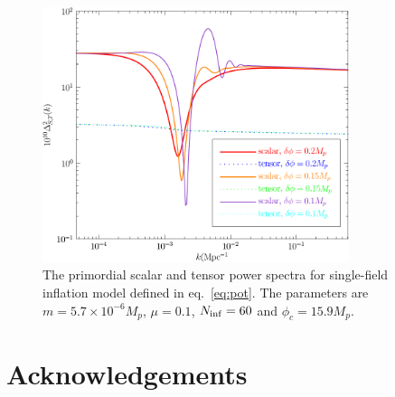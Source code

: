 \documentclass[11pt]{article}
\def \figwidth{0.8\textwidth}
\begin{document}
\begin{figure}
\includegraphics[width=\figwidth]{bumppower.pdf}
\caption{The primordial scalar and tensor power spectra for single-field inflation model defined in eq.~\eqref{eq:pot}. The parameters are $m=5.7\times 10^{-6}M_p$, $\mu = 0.1$, $N_{\rm inf} = 60$ and $\phi_c = 15.9M_p$. \label{fig:bumppower}}
\end{figure}

\section*{Acknowledgements}


  

\end{document}
